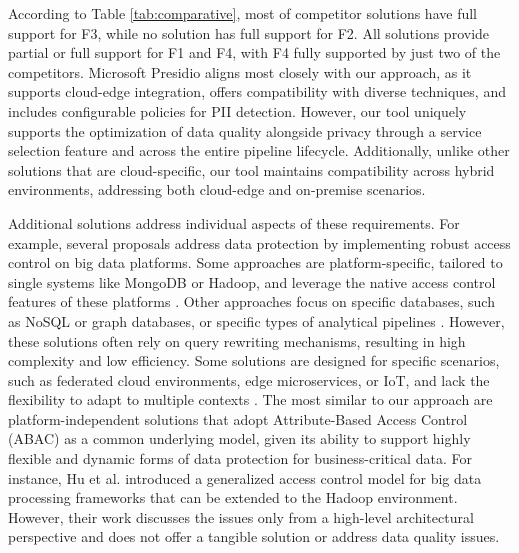 {{According to Table \ref{tab:comparative}, most of competitor solutions have full support for F3, while no solution has full support for F2. All solutions provide partial or full support for F1 and F4, with F4 fully supported by just two of the competitors.  Microsoft Presidio aligns most closely with our approach, as it supports cloud-edge integration, offers compatibility with diverse techniques, and includes configurable policies for PII detection. However, our tool uniquely supports the optimization of data quality alongside privacy through a service selection feature and across the entire pipeline lifecycle. Additionally, unlike other solutions that are cloud-specific, our tool maintains compatibility across hybrid environments, addressing both cloud-edge and on-premise scenarios.}

Additional solutions address individual aspects of these requirements. For example, several proposals address data protection by implementing robust access control on big data platforms. Some approaches are platform-specific, tailored to single systems like MongoDB or Hadoop, and leverage the native access control features of these platforms \cite{rathore2017hadoop,anisetti2018privacy,FederationAC:Journ:2020,Sandhu:ABAC:2018,GuptaSandu:2017}. Other approaches focus on specific databases, such as NoSQL or graph databases, or specific types of analytical pipelines \cite{AConGraphDB:2021, AConMongoDB:2022, ABACforHBase:2019}. However, these solutions often rely on query rewriting mechanisms, resulting in high complexity and low efficiency. Some solutions are designed for specific scenarios, such as federated cloud environments, edge microservices, or IoT, and lack the flexibility to adapt to multiple contexts \cite{MultipartyAC:2019, IoTSecurity}.
%
The most similar to our approach are platform-independent solutions that adopt Attribute-Based Access Control (ABAC) \cite{XACML3.0} as a common underlying model, given its ability to support highly flexible and dynamic forms of data protection for business-critical data. {\color{OurColor}For instance, Hu et al. \cite{ HUFerraiolo:2014} introduced a generalized access control model for big data processing frameworks that can be extended to the Hadoop environment. However, their work discusses the issues only from a high-level architectural perspective and does not offer a tangible solution or address data quality issues.}

}
